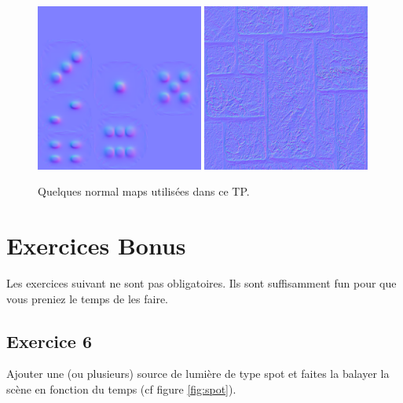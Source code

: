 \documentclass{article}
\begin{document}
\begin{figure}
  \begin{center}
    \includegraphics[width=0.49\textwidth]{images/normal_map}
    \includegraphics[width=0.49\textwidth]{images/normal_map2}
  \end{center}
  \caption{Quelques normal maps utilisées dans ce TP.}
  \label{fig:normalmap}
\end{figure}          

\section{Exercices Bonus}
\label{sec:exercices_bonus}

Les exercices suivant ne sont pas obligatoires. Ils sont suffisamment fun pour que vous preniez le temps de les faire. 

\subsection{Exercice 6}
\label{sec:exercice_6}
Ajouter une (ou plusieurs) source de lumière de type spot et faites la balayer
la scène en fonction du temps (cf figure \ref{fig:spot}).
\end{document}
